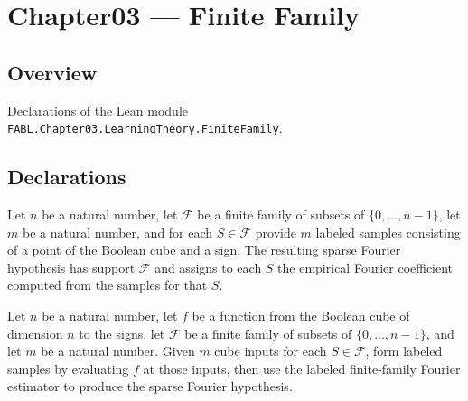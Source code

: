 \chapter{Chapter03 — Finite Family}
\section{Overview}

Declarations of the Lean module \texttt{FABL.Chapter03.LearningTheory.FiniteFamily}.

\section{Declarations}

\begin{definition}
\label{FABL.finiteFamilyFourierEstimatorLabeledOutput}
\leanok
{}
Let $n$ be a natural number, let $\mathcal F$ be a finite family of subsets of
$\{0,\ldots,n-1\}$, let $m$ be a natural number, and for each $S\in\mathcal F$ provide
$m$ labeled samples consisting of a point of the Boolean cube and a sign. The resulting
sparse Fourier hypothesis has support $\mathcal F$ and assigns to each $S$ the empirical
Fourier coefficient computed from the samples for that $S$.
\end{definition}

\begin{definition}
\label{FABL.finiteFamilyFourierEstimatorOutput}
\leanok
{}
Let $n$ be a natural number, let $f$ be a function from the Boolean cube of dimension
$n$ to the signs, let $\mathcal F$ be a finite family of subsets of $\{0,\ldots,n-1\}$,
and let $m$ be a natural number. Given $m$ cube inputs for each $S\in\mathcal F$, form
labeled samples by evaluating $f$ at those inputs, then use the labeled finite-family
Fourier estimator to produce the sparse Fourier hypothesis.
\end{definition}

